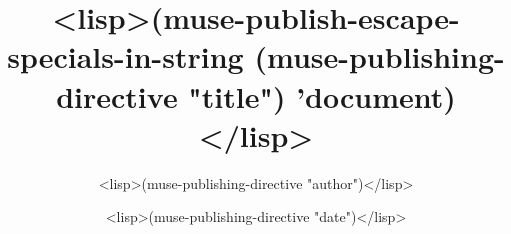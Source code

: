 \documentclass[ignorenonframetext]{beamer}
\title{<lisp>(muse-publish-escape-specials-in-string (muse-publishing-directive "title") 'document)</lisp>}
\author{<lisp>(muse-publishing-directive "author")</lisp>}
\date{<lisp>(muse-publishing-directive "date")</lisp>}
\begin{document}
\frame{\titlepage}
\end{document}
